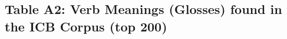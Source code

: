 \documentclass{article}
\begin{document}
\begin{figure}[H]
\end{figure}
\clearpage

\hypertarget{app:verbs}{%
\subsection{Table A2: Verb Meanings (Glosses) found in the ICB Corpus
(top 200)}\label{app:verbs}}

\hphantom{em}

\providecommand{\docline}[3]{\noalign{\global\setlength{\arrayrulewidth}{#1}}\arrayrulecolor[HTML]{#2}\cline{#3}}
\end{document}
